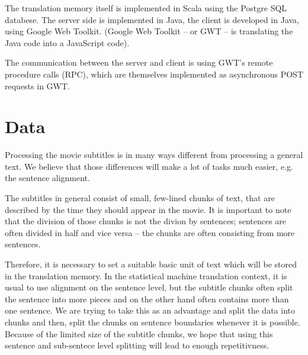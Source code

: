 The translation memory itself is implemented in Scala using the Postgre SQL databese. The server side is implemented in Java, the client is developed in Java, using Google Web Toolkit. (Google Web Toolkit -- or GWT -- is translating the Java code into a JavaScript code).

The communication between the server and client is using GWT's remote procedure calls (RPC), which are themselves implemented as asynchronous POST requests in GWT.

\section{Data}

Processing the movie subtitles is in many ways different from processing a general text. We believe that those differences will make a lot of tasks much easier, e.g. the sentence alignment.


The subtitles in general consist of small, few-lined chunks of text, that are described by the time they should appear in the movie. It is important to note that the division of those chunks is not the divion by sentences; sentences are often divided in half and vice versa -- the chunks are often consisting from more sentences.    

Therefore, it is necessary to set a suitable basic unit of text which will be stored in the translation memory. In the statistical machine translation context, it is usual to use alignment on the sentence level, but the subtitle chunks often split the sentence into more pieces and on the other hand often contains more than one sentence. 
We  are trying to take this as an advantage and split the data into chunks and then, split the chunks on  sentence boundaries whenever it is possible. Because of the limited size of the subtitle chunks, we hope that using this sentence and sub-sentece level splitting will lead to enough repetitivness.



